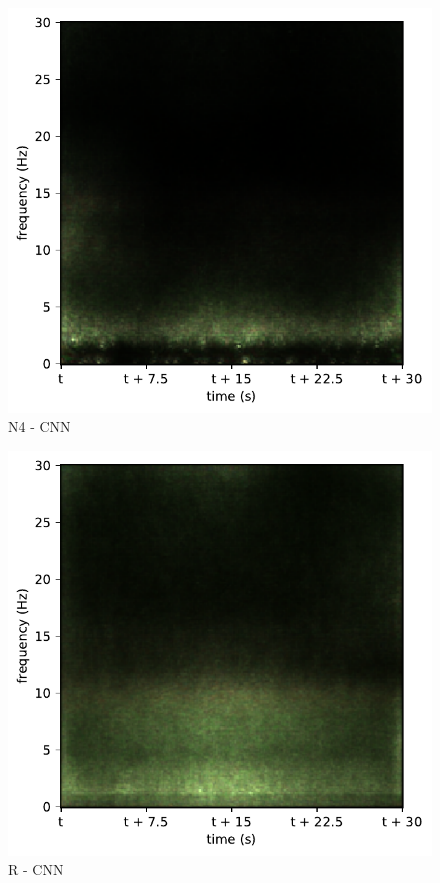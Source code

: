 \begin{subfigure}{.16\textwidth}
  \centering
  \includegraphics[width=1\linewidth]{./pics/class_master_4}
  \caption{N4 - CNN}
  \label{fig_1_25}
\end{subfigure}%
\begin{subfigure}{.16\textwidth}
  \centering
  \includegraphics[width=1\linewidth]{./pics/class_master_5}
  \caption{R - CNN}
  \label{fig_1_26}
\end{subfigure}


